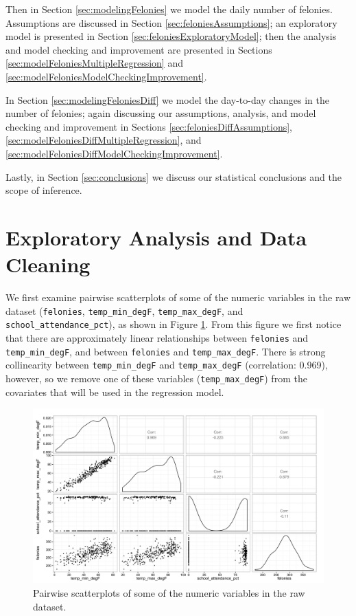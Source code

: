 \documentclass[11pt,notitlepage]{article}
\begin{document}
Then in Section \ref{sec:modelingFelonies} we model the daily number of felonies. Assumptions are discussed in Section \ref{sec:feloniesAssumptions}; an exploratory model is presented in Section \ref{sec:feloniesExploratoryModel}; then the analysis and model checking and improvement are presented in Sections \ref{sec:modelFeloniesMultipleRegression} and \ref{sec:modelFeloniesModelCheckingImprovement}.

In Section \ref{sec:modelingFeloniesDiff} we model the day-to-day changes in the number of felonies; again discussing our assumptions, analysis, and model checking and improvement in Sections \ref{sec:feloniesDiffAssumptions}, \ref{sec:modelFeloniesDiffMultipleRegression}, and \ref{sec:modelFeloniesDiffModelCheckingImprovement}.

Lastly, in Section \ref{sec:conclusions} we discuss our statistical conclusions and the scope of inference.





\section{Exploratory Analysis and Data Cleaning}
\label{sec:eda}

We first examine pairwise scatterplots of some of the numeric variables in the raw dataset (\texttt{felonies}, \texttt{temp_min_degF}, \texttt{temp_max_degF}, and \texttt{school_attendance_pct}), as shown in Figure \ref{fig:pairsNumericExclAcc}. From this figure we first notice that there are approximately linear relationships between \texttt{felonies} and \texttt{temp_min_degF}, and between \texttt{felonies} and \texttt{temp_max_degF}. There is strong collinearity between \texttt{temp_min_degF} and \texttt{temp_max_degF} (correlation: 0.969), however, so we remove one of these variables (\texttt{temp_max_degF}) from the covariates that will be used in the regression model.

\begin{figure}[!h]
	\centering
	\captionsetup{width=0.9\textwidth}
	\includegraphics[width=6in]{figures/pairsNumericExclAcc.png}
	\caption{Pairwise scatterplots of some of the numeric variables in the raw dataset.}
	\label{fig:pairsNumericExclAcc}
\end{figure}
\end{document}
